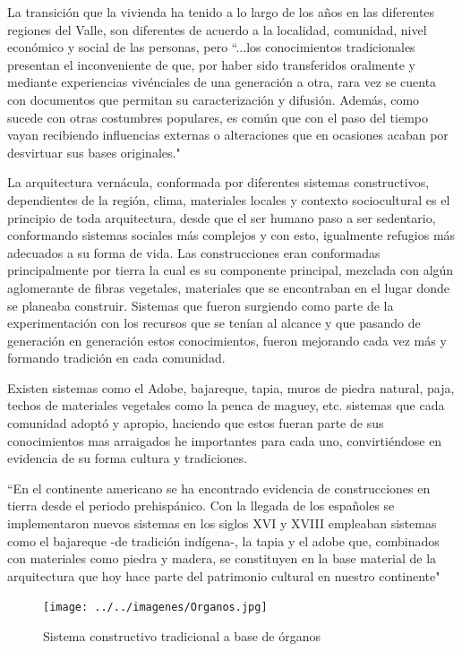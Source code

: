La transición que la vivienda ha tenido a lo largo de los años en las diferentes regiones del Valle, son diferentes de acuerdo a la localidad, comunidad, nivel económico y social de las personas, pero ``...los conocimientos tradicionales presentan el inconveniente de que, por haber sido transferidos oralmente y mediante experiencias vivénciales de una generación a otra, rara vez se cuenta con documentos que permitan su caracterización y difusión. Además, como sucede con otras costumbres populares, es común que con el paso del tiempo vayan recibiendo influencias externas o alteraciones que en ocasiones acaban por desvirtuar sus bases originales."\citep{guerrero2007arquitectura}

La arquitectura vernácula, conformada por diferentes sistemas constructivos, dependientes de la región, clima, materiales locales y contexto sociocultural es el principio de toda arquitectura, desde que el ser humano paso a ser sedentario, conformando sistemas sociales más complejos y con esto, igualmente refugios más adecuados a su forma de vida. Las construcciones eran conformadas principalmente por tierra la cual es su componente principal, mezclada con algún aglomerante de fibras vegetales, materiales que se encontraban en el lugar donde se planeaba construir. Sistemas que fueron surgiendo como parte de la experimentación con los recursos que se tenían al alcance y que pasando de generación en generación estos conocimientos, fueron mejorando cada vez más y formando tradición en cada comunidad.

Existen sistemas como el Adobe, bajareque, tapia, muros de piedra natural, paja, techos de materiales vegetales como la penca de maguey, etc. sistemas que cada comunidad adoptó y apropio, haciendo que estos fueran parte de sus conocimientos mas arraigados he importantes para cada uno, convirtiéndose en evidencia de su forma cultura y tradiciones.

``En el continente americano se ha encontrado evidencia de construcciones en tierra desde el periodo prehispánico. Con la llegada de los españoles se implementaron nuevos sistemas en los siglos XVI y XVIII empleaban sistemas como el bajareque -de tradición indígena-, la tapia y el adobe que, combinados con materiales como piedra y madera, se constituyen en la base material de la arquitectura que hoy hace parte del patrimonio cultural en nuestro continente"\citep{beltrantradicion}

\begin{figure}[ht]
    \center
    \texttt{[image: ../../imagenes/Organos.jpg]}
    \caption{Sistema constructivo tradicional a base de órganos}
\end{figure}

